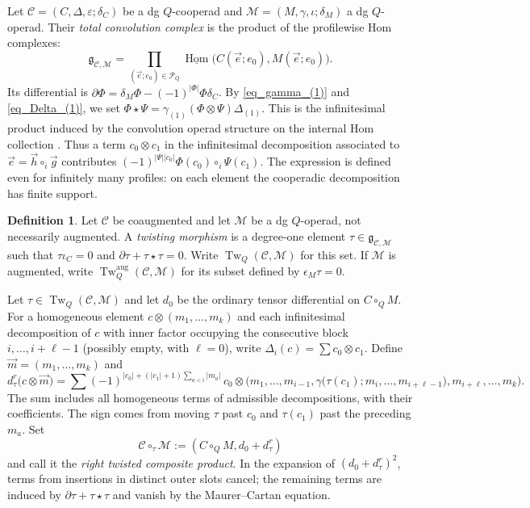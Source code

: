 \documentclass[11pt,letterpaper]{article}
\numberwithin{equation}{section}
\theoremstyle{plain}
\theoremstyle{definition}
\newtheorem{defn}[thm]{Definition}
\theoremstyle{remark}
\newcommand{\Hom}{\operatorname{Hom}}
\begin{document}
Let $\mathscr C=(C,\Delta,\varepsilon;\delta_C)$ be a dg $Q$-cooperad and $\mathscr M=(M,\gamma,\iota;\delta_M)$ a dg $Q$-operad. Their \textit{total convolution complex} is the product of the profilewise Hom complexes:
\begin{equation}\label{eq_total_convolution_complex}
\mathfrak g_{\mathscr C,\mathscr M}
 =\prod_{(\vec e;e_0)\in\mathcal P_Q}
 \underline{\Hom}\bigl(C(\vec e;e_0),M(\vec e;e_0)\bigr).
\end{equation}
Its differential is $
\partial\Phi=\delta_M\Phi-(-1)^{|\Phi|}\Phi\delta_C$.
By \eqref{eq_gamma_(1)} and \eqref{eq_Delta_(1)}, we set
$\Phi\star\Psi=\gamma_{(1)}(\Phi\otimes\Psi)\Delta_{(1)}$.
This is the infinitesimal product induced by the convolution operad structure on the internal Hom collection \cite{berger2003axiomatic,loday2012algebraic}.
Thus a term $c_0\otimes c_1$ in the infinitesimal decomposition associated to $\vec e=\vec h\circ_i\vec g$ contributes
$(-1)^{|\Psi||c_0|}\Phi(c_0)\circ_i\Psi(c_1)$.
The expression is defined even for infinitely many profiles: on each element the cooperadic decomposition has finite support.

\begin{defn}\label{def:fc_twisting_morphism}
Let $\mathscr C$ be coaugmented and let $\mathscr M$ be a dg $Q$-operad, not necessarily augmented. A \textit{twisting morphism} is a degree-one element $\tau\in\mathfrak g_{\mathscr C,\mathscr M}$ such that $\tau\iota_C=0$ and $\partial\tau+\tau\star\tau=0$.
Write $\operatorname{Tw}_Q(\mathscr C,\mathscr M)$ for this set. If $\mathscr M$ is augmented, write $\operatorname{Tw}^{\mathrm{aug}}_Q(\mathscr C,\mathscr M)$ for its subset defined by $\epsilon_M\tau=0$.
\end{defn}


Let $\tau\in\operatorname{Tw}_Q(\mathscr C,\mathscr M)$ and let $d_0$ be the ordinary tensor differential on $C\circ_Q M$.
For a homogeneous element $c\otimes(m_1,\ldots,m_k)$ and each infinitesimal decomposition of $c$ with inner factor occupying the consecutive block $i,\ldots,i+\ell-1$ (possibly empty, with $\ell=0$), write $\Delta_i(c)=\sum c_0\otimes c_1$. Define $\vec m= (m_1,\dots, m_k)$ and
\begin{equation*} 
 d_\tau^r\bigl(c\otimes \vec m \bigr) =\sum(-1)^{|c_0|+(|c_1|+1)\sum_{a<i}|m_a|}\,c_0\otimes
 \bigl(m_1,\ldots,m_{i-1}, \gamma\bigl(\tau(c_1);m_i,\ldots,m_{i+\ell-1}\bigr),
 m_{i+\ell},\ldots,m_k\bigr).
\end{equation*}
The sum includes all homogeneous terms of admissible decompositions, with their coefficients. The sign comes from moving $\tau$ past $c_0$ and $\tau(c_1)$ past the preceding $m_a$. Set
\begin{equation*}\mathscr C\circ_\tau\mathscr M:=(C\circ_Q M,d_0+d_\tau^r)
\end{equation*}
and call it the \textit{right twisted composite product}. In the expansion of $(d_0+d_\tau^r)^2$, terms from insertions in distinct outer slots cancel; the remaining terms are induced by $\partial\tau+\tau\star\tau$ and vanish by the Maurer--Cartan equation.
\end{document}
